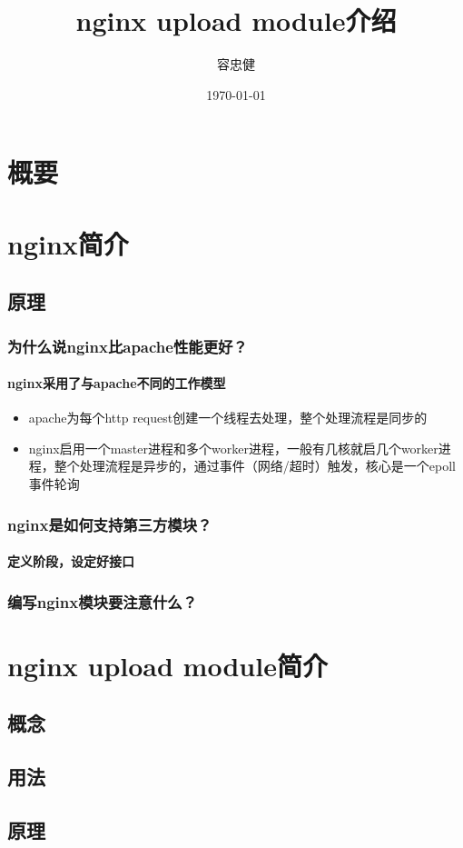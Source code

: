 \documentclass[aspectratio=169,draft]{ctexbeamer}
\title{nginx upload module介绍}
\author{容忠健}
\institute{@Bigo}
\date{\today}
\begin{document}
\frame[plain]{\titlepage}


\section*{概要}
\begin{frame}
  \tableofcontents
\end{frame}

\section{nginx简介}
\subsection*{原理}
\begin{frame}
  \frametitle{为什么说nginx比apache性能更好？}
  \framesubtitle{nginx采用了与apache不同的工作模型}
  \begin{itemize}
  \item<2-> apache为每个http request创建一个线程去处理，整个处理流程是同步的
  \item<3->nginx启用一个master进程和多个worker进程，一般有几核就启几个worker进程，整个处理流程是异步的，通过事件（网络/超时）触发，核心是一个epoll事件轮询
  \end{itemize}
\end{frame}
\begin{frame}
  \frametitle{nginx是如何支持第三方模块？}
  \framesubtitle{定义阶段，设定好接口}
\end{frame}
\begin{frame}
  \frametitle{编写nginx模块要注意什么？}
\end{frame}
\section{nginx upload module简介}
\subsection*{概念}
\subsection*{用法}
\subsection*{原理}
\end{document}
